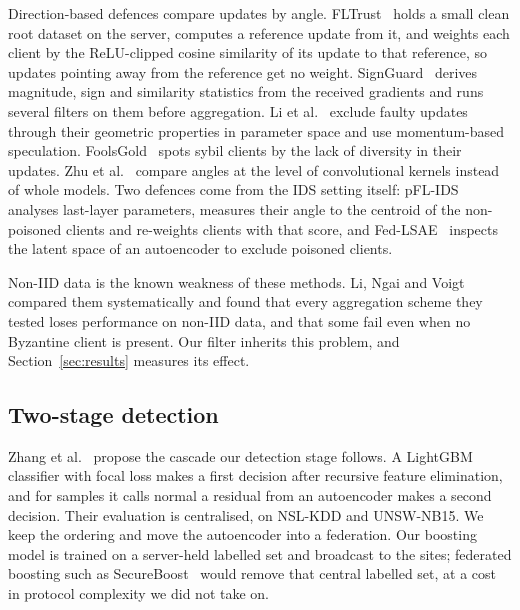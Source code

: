 Direction-based defences compare updates by angle. FLTrust~\cite{cao2021fltrust} holds a small clean root dataset on the server, computes a reference update from it, and weights each client by the ReLU-clipped cosine similarity of its update to that reference, so updates pointing away from the reference get no weight. SignGuard~\cite{xu2022signguard} derives magnitude, sign and similarity statistics from the received gradients and runs several filters on them before aggregation. Li et al.~\cite{li2021spatial} exclude faulty updates through their geometric properties in parameter space and use momentum-based speculation. FoolsGold~\cite{fung2020} spots sybil clients by the lack of diversity in their updates. Zhu et al.~\cite{zhu2024cosine} compare angles at the level of convolutional kernels instead of whole models. Two defences come from the IDS setting itself: pFL-IDS~\cite{thein2024} analyses last-layer parameters, measures their angle to the centroid of the non-poisoned clients and re-weights clients with that score, and Fed-LSAE~\cite{luong2024} inspects the latent space of an autoencoder to exclude poisoned clients.

Non-IID data is the known weakness of these methods. Li, Ngai and Voigt~\cite{li2024experimental} compared them systematically and found that every aggregation scheme they tested loses performance on non-IID data, and that some fail even when no Byzantine client is present. Our filter inherits this problem, and Section~\ref{sec:results} measures its effect.

\subsection{Two-stage detection}
Zhang et al.~\cite{zhang2023twostage} propose the cascade our detection stage follows. A LightGBM classifier with focal loss makes a first decision after recursive feature elimination, and for samples it calls normal a residual from an autoencoder makes a second decision. Their evaluation is centralised, on NSL-KDD and UNSW-NB15. We keep the ordering and move the autoencoder into a federation. Our boosting model is trained on a server-held labelled set and broadcast to the sites; federated boosting such as SecureBoost~\cite{cheng2021secureboost} would remove that central labelled set, at a cost in protocol complexity we did not take on.

